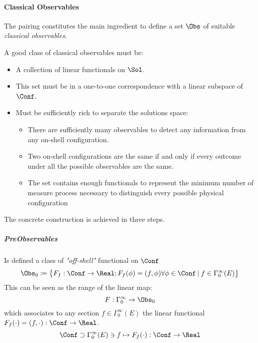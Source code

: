 \documentclass[Main]{subfiles}
\begin{document}
   					
   		\paragraph{Classical Observables}
   		The pairing constitutes the main ingredient to define a set $\Obs$ of suitable \emph{classical observables}.
   		\begin{remark}
   			A good class of classical observables must be:
   			\begin{itemize}
   				\item A collection of  linear functionals on $\Sol$.
   				\item This set must be in a one-to-one correspondence  with a linear subspace of $\Conf$.
   				\item Must be sufficiently rich to separate the solutions space:
   					\begin{itemize}
   						\item There are sufficiently many observables to detect any information from any on-shell configuration.
   						\item Two on-shell configurations are the same if and only if every outcome under all the possible observables are the same.
   						\item The set contains enough functionals to represent the minimum number of measure process necessary to distinguish every possible physical configuration
   					\end{itemize}
   			\end{itemize}
   		\end{remark}
   		The concrete construction is achieved in three steps.
   		
 			\subparagraph{PreObservables}
 				Is defined a class of \emph{"off-shell"} functional on $\Conf$
   							\begin{displaymath}
   								\Obs_0 \coloneqq \big\{ F_f: \Conf \rightarrow \Real ;  F_f(\phi)=( f, \phi) \forall \phi \in \Conf \:\vert
   								\:  f \in \Gamma_0^\infty(E)	\big\}
   							\end{displaymath}
   				This can be seen as the range of the linear map:
   				\begin{displaymath}
   					F: \Gamma_0^\infty \rightarrow \Obs_0
  	 			\end{displaymath}
   				which associates to any section $f\in \Gamma_0^\infty(E)$ the linear functional 
   				$F_f(\cdot) = (f,\cdot) :\Conf \rightarrow \Real$.
  	 			\begin{displaymath}
   					\Conf 	\supset \Gamma^\infty_0(E) \ni f \mapsto F_f(\cdot):\Conf \rightarrow \Real
   				\end{displaymath}			
			
\end{document}
